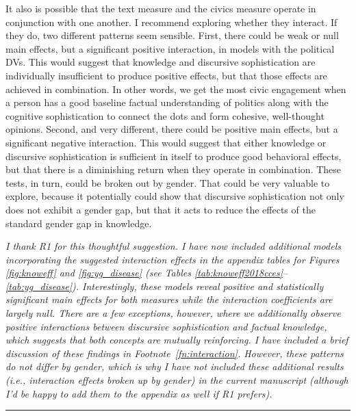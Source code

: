 It also is possible that the text measure and the civics measure operate in conjunction with one another. I recommend exploring whether they interact. If they do, two different patterns seem sensible. First, there could be weak or null main effects, but a significant positive interaction, in models with the political DVs. This would suggest that knowledge and discursive sophistication are individually insufficient to produce positive effects, but that those effects are achieved in combination. In other words, we get the most civic engagement when a person has a good baseline factual understanding of politics along with the cognitive sophistication to connect the dots and form cohesive, well-thought opinions. Second, and very different, there could be positive main effects, but a significant negative interaction. This would suggest that either knowledge or discursive sophistication is sufficient in itself to produce good behavioral effects, but that there is a diminishing
return when they operate in combination. These tests, in turn, could be broken out by gender. That could be very valuable to explore, because it potentially could show that discursive sophistication not only does not exhibit a gender gap, but that it acts to reduce the effects of the standard gender gap in knowledge.

\textit{I thank R1 for this thoughtful suggestion. I have now included additional models incorporating the suggested interaction effects in the appendix tables for Figures \ref{fig:knoweff} and \ref{fig:yg_disease} (see Tables \ref{tab:knoweff2018cces}--\ref{tab:yg_disease}). Interestingly, these models reveal positive and statistically significant main effects for both measures while the interaction coefficients are largely null. There are a few exceptions, however, where we additionally observe {\normalfont positive} interactions between discursive sophistication and factual knowledge, which suggests that both concepts are mutually reinforcing. I have included a brief discussion of these findings in Footnote~\ref{fn:interaction}. However, these patterns do not differ by gender, which is why I have not included these additional results (i.e., interaction effects broken up by gender) in the current manuscript (although I'd be happy to add them to the appendix as well if R1 prefers).}


\rule{\linewidth}{.01cm}

